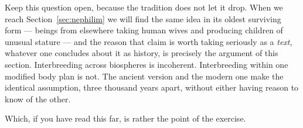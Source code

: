 Keep this question open, because the tradition does not let it drop. When we reach
Section~\ref{sec:nephilim} we will find the same idea in its oldest surviving form ---
beings from elsewhere taking human wives and producing children of unusual stature --- and
the reason that claim is worth taking seriously as a \emph{text}, whatever one concludes
about it as history, is precisely the argument of this section. Interbreeding across
biospheres is incoherent. Interbreeding within one modified body plan is not. The ancient
version and the modern one make the identical assumption, three thousand years apart,
without either having reason to know of the other.

Which, if you have read this far, is rather the point of the exercise.
